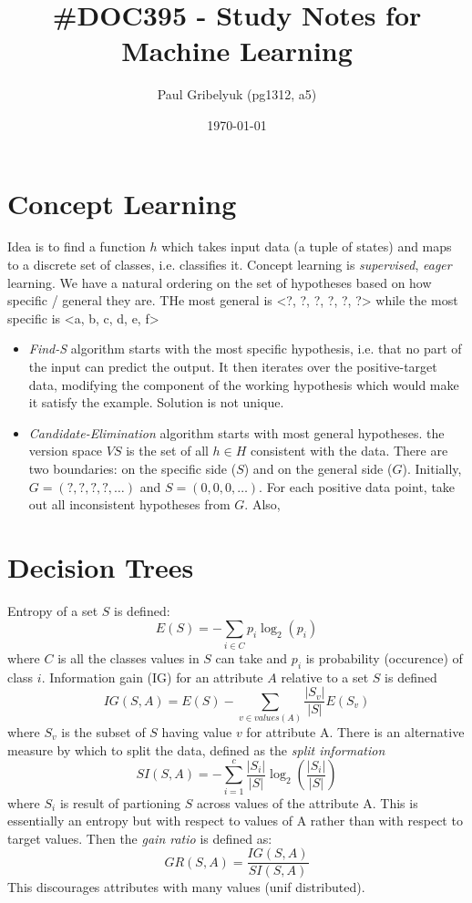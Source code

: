 \documentclass[a4paper,10pt]{article}
\author{Paul Gribelyuk (pg1312, a5)}
\title{\Large \#DOC395 - Study Notes for Machine Learning}
\date{\today}
\begin{document}
\maketitle
\section{Concept Learning}
Idea is to find a function $h$ which takes input data (a tuple of states) and maps to a discrete set of classes, i.e. classifies it.  Concept learning is \emph{supervised}, \emph{eager} learning.  We have a natural ordering on the set of hypotheses based on how specific / general they are.  THe most general is <?, ?, ?, ?, ?, ?> while the most specific is <a, b, c, d, e, f> 
\begin{itemize}
\item \emph{Find-S} algorithm starts with the most specific hypothesis, i.e. that no part of the input can predict the output.  It then iterates over the positive-target data, modifying the component of the working hypothesis which would make it satisfy the example.  Solution is not unique.
\item \emph{Candidate-Elimination} algorithm starts with most general hypotheses.  the version space $VS$ is the set of all $h\in H$ consistent with the data.  There are two boundaries: on the specific side ($S$) and on the general side ($G$).  Initially, $G = (?,?,?,?,\ldots)$ and $S=(0,0,0,\ldots)$.  For each positive data point, take out all inconsistent hypotheses from $G$.  Also, 
\end{itemize}

\section{Decision Trees}
Entropy of a set $S$ is defined:
$$
E(S) = -\sum_{i\in C} p_i\log_2(p_i)
$$
where $C$ is all the classes values in $S$ can take and $p_i$ is probability (occurence) of class $i$.
Information gain (IG) for an attribute $A$ relative to a set $S$ is defined
$$
IG(S, A) = E(S) - \sum_{v\in values(A)}\frac{|S_v|}{|S|}E(S_v)
$$
where $S_v$ is the subset of $S$ having value $v$ for attribute A.  There is an alternative measure by which to split the data, defined as the \emph{split information}
$$
SI(S, A) = -\sum_{i=1}^c \frac{|S_i|}{|S|}\log_2\left(\frac{|S_i|}{|S|}\right)
$$
where $S_i$ is result of partioning $S$ across values of the attribute A.  This is essentially an entropy but with respect to values of A rather than with respect to target values.  Then the \emph{gain ratio} is defined as:
$$
GR(S, A) = \frac{IG(S, A)}{SI(S, A)}
$$
This discourages attributes with many values (unif distributed).
\end{document}
